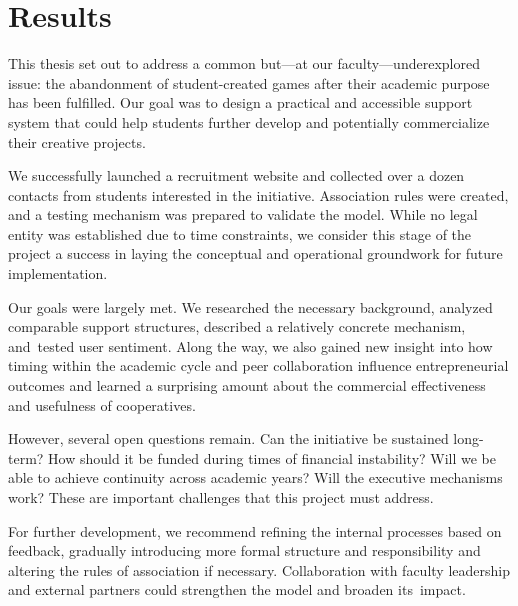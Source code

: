 
\chapter*{Results}

This thesis set out to address a common but---at our faculty---underexplored issue: the abandonment of student-created games after their academic purpose has been fulfilled. Our goal was to design a practical and accessible support system that could help students further develop and potentially commercialize their creative projects.

We successfully launched a recruitment website and collected over a dozen contacts from students interested in the initiative. Association rules were created, and a testing mechanism was prepared to validate the model. While no legal entity was established due to time constraints, we consider this stage of the project a success in laying the conceptual and operational groundwork for future implementation.

Our goals were largely met. We researched the necessary background, analyzed comparable support structures, described a relatively concrete mechanism, and~tested user sentiment. Along the way, we also gained new insight into how timing within the academic cycle and peer collaboration influence entrepreneurial outcomes and learned a surprising amount about the commercial effectiveness and usefulness of cooperatives.

However, several open questions remain. Can the initiative be sustained long-term? How should it be funded during times of financial instability? Will we be able to achieve continuity across academic years? Will the executive mechanisms work? These are important challenges that this project must address.

For further development, we recommend refining the internal processes based on feedback, gradually introducing more formal structure and responsibility and altering the rules of association if necessary. Collaboration with faculty leadership and external partners could strengthen the model and broaden its~impact.

